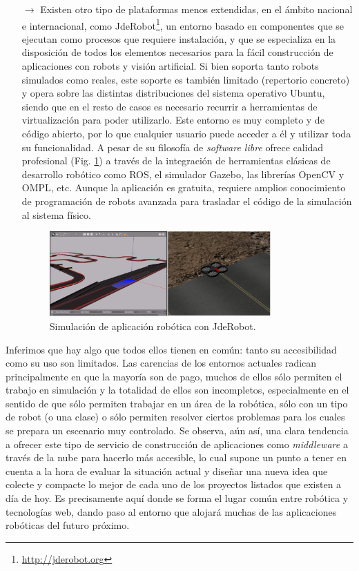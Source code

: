 \begin{itemize}
\item [$\rightarrow$] Existen otro tipo de plataformas menos extendidas, en el ámbito nacional e internacional, como JdeRobot\footnote{\url{http://jderobot.org}}, un entorno basado en componentes que se ejecutan como procesos que requiere instalación, y que se especializa en la disposición de todos los elementos necesarios para la fácil construcción de aplicaciones con robots y visión artificial. Si bien soporta tanto robots simulados como reales, este soporte es también limitado (repertorio concreto) y opera sobre las distintas distribuciones del sistema operativo Ubuntu, siendo que en el resto de casos es necesario recurrir a herramientas de virtualización para poder utilizarlo. Este entorno es muy completo y de código abierto, por lo que cualquier usuario puede acceder a él y utilizar toda su funcionalidad. A pesar de su filosofía de \textit{software libre} ofrece calidad profesional (Fig. \ref{jderobot}) a través de la integración de herramientas clásicas de desarrollo robótico como ROS, el simulador Gazebo, las librerías OpenCV y OMPL, etc. Aunque la aplicación es gratuita, requiere amplios conocimiento de programación de robots avanzada para trasladar el código de la simulación al sistema físico.

\begin{figure}[!hbtp]  \centering\noindent
    \includegraphics[width=0.8\textwidth]{figures/jderobot_simulation.png}
    \caption{Simulación de aplicación robótica con JdeRobot.}
    \label{jderobot}
\end{figure}

\end{itemize}

Inferimos que hay algo que todos ellos tienen en común: tanto su accesibilidad como su uso son limitados. Las carencias de los entornos actuales radican principalmente en que la mayoría son de pago, muchos de ellos sólo permiten el trabajo en simulación y la totalidad de ellos son incompletos, especialmente en el sentido de que sólo permiten trabajar en un área de la robótica, sólo con un tipo de robot (o una clase) o sólo permiten resolver ciertos problemas para los cuales se prepara un escenario muy controlado. Se observa, aún así, una clara tendencia a ofrecer este tipo de servicio de construcción de aplicaciones como \textit{middleware} a través de la nube para hacerlo más accesible, lo cual supone un punto a tener en cuenta a la hora de evaluar la situación actual y diseñar una nueva idea que colecte y compacte lo mejor de cada uno de los proyectos listados que existen a día de hoy. Es precisamente aquí donde se forma el lugar común entre robótica y tecnologías web, dando paso al entorno que alojará muchas de las aplicaciones robóticas del futuro próximo.

